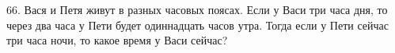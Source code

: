 66. Вася и Петя живут в разных часовых поясах. Если у Васи три часа дня, то через два часа у Пети будет одиннадцать часов утра. Тогда если у Пети сейчас три часа ночи, то какое время у Васи сейчас?\\
